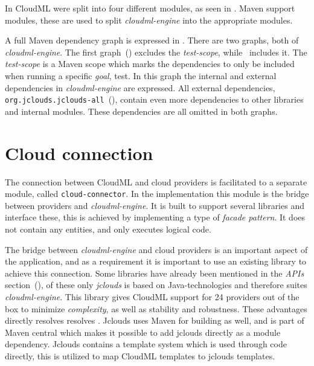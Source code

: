 In  CloudML were split into four different modules, as seen in .
Maven support modules, these are used to split \emph{cloudml-engine} into the appropriate 
modules.

A full Maven dependency graph is expressed in .
There are two graphs, both of \emph{cloudml-engine}.
The first graph~() excludes the \emph{test-scope},
while~ includes it.
The \emph{test-scope} is a Maven scope which marks the dependencies to only be included
when running a specific \emph{goal}, \eg test.
In this graph the internal and external dependencies in \emph{cloudml-engine} are expressed.
All external dependencies, 
\eg \texttt{org.jclouds.jclouds-all}~(),
contain even more dependencies to other libraries and internal modules.
These dependencies are all omitted in both graphs.


\section{Cloud connection}

The connection between CloudML and cloud providers is facilitated 
to a separate module, called \texttt{cloud-connector}.
In the implementation this module is the bridge between providers and \emph{cloudml-engine}.
It is built to support several libraries and interface these,
this is achieved by implementing a type of \emph{facade pattern}.
It does not contain any entities, and only executes logical code. 

The bridge between \emph{cloudml-engine} and cloud providers is an important aspect of the application, 
and as a requirement it is important to use an existing library to achieve this connection.
Some libraries have already been mentioned in the \emph{APIs} section~(),
of these only \emph{jclouds} is based on Java-technologies and therefore suites \emph{cloudml-engine}.
This library gives CloudML support for 24 providers out of the box to minimize \emph{complexity},
as well as stability and robustness.
These advantages directly resolves resolves .
Jclouds uses Maven for building as well, and is part of Maven central which makes 
it possible to add jclouds directly as a module dependency.
Jclouds contains a template system which is used through code directly, this is utilized 
to map CloudML templates to jclouds templates.


